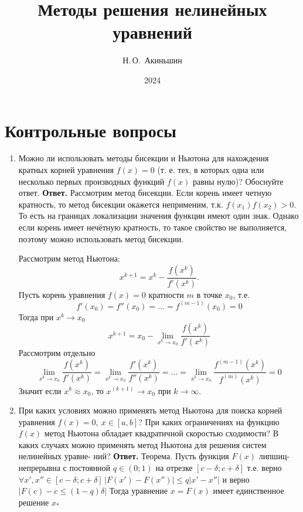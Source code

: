 \documentclass{article}
\title{Методы решения нелинейных уравнений}
\author{Н.\,О.~Акиньшин}
\date{2024}
\begin{document}
    \maketitle
    \newpage
    \tableofcontents
    \newpage

    \section{Контрольные вопросы}
    \begin{enumerate}
        \item Можно ли использовать методы бисекции и Ньютона
        для нахождения кратных корней уравнения $f(x) = 0$ (т. е.
        тех, в которых одна или несколько первых производных
        функций $f(x)$ равны нулю)? Обоснуйте ответ.
        \newline 
        {\bfseries Ответ. } 
        Рассмотрим метод бисекции. 
        Если корень имеет четную кратность, то метод бисекции окажется неприменим, т.к. 
        $f(x_1)f(x_2) > 0$. То есть на границах локализации значения функции имеют один знак. 
        Однако если корень имеет нечётную кратность, то такое свойство не выполняется, поэтому можно использовать метод бисекции. 

        Рассмотрим метод Ньютона:
        \begin{equation*}
            x^{k+1} = x^k - \frac{f(x^k)}{f'(x^k)}.
        \end{equation*}
        Пусть корень  уравнения $f(x) = 0$ кратности $m$ в точке $x_0$, т.е. 
        \begin{equation*}
            f'(x_0) = f''(x_0) = \ldots = f^{(m-1)}(x_0) = 0
        \end{equation*}
        Тогда при $x^k \to x_0$
        \begin{equation*}
            x^{k+1} = x_0 - \lim\limits_{x^k \to x_0} \frac{f(x^k)}{f'(x^k)}
        \end{equation*}
        Рассмотрим отдельно 
        \begin{equation*}
            \lim\limits_{x^k \to x_0} \frac{f(x^k)}{f'(x^k)} = \lim\limits_{x^k \to x_0} \frac{f'(x^k)}{f''(x^k)} 
            = \ldots = \lim\limits_{x^k \to x_0} \frac{f^{(m-1)}(x^k)}{f^{(m)}(x^k)} = 0
        \end{equation*}
        Значит если $x^k \approx x_0$, то $x^{(k+1)} \to x_0$ при $k \to \infty$.
        \item При каких условиях можно применять метод Ньютона для
        поиска корней уравнения \mbox{$f(x) = 0, \  x \in [a, b]$}? При каких ограничениях
        на функцию $f(x)$ метод Ньютона обладает квадратичной
        скоростью сходимости? В каких случаях можно применять
        метод Ньютона для решения систем нелинейных уравне-
        ний?
        \newline 
        {\bfseries Ответ. } 
        Теорема. Пусть функция $F(x)$ липшиц-непрерывна с постоянной $q \in (0;1)$ на отрезке $[c- \delta;c+\delta]$ т.е. верно $\forall x', x'' \in [c- \delta;c+\delta]\, |F(x')-F(x'')| \le q|x'-x''|$ и верно $|F(c)-c \le (1-q)\delta|$ Тогда уравнение $x=F(x)$ имеет единственное решение $x_*$
	

\end{enumerate}
\end{document}
